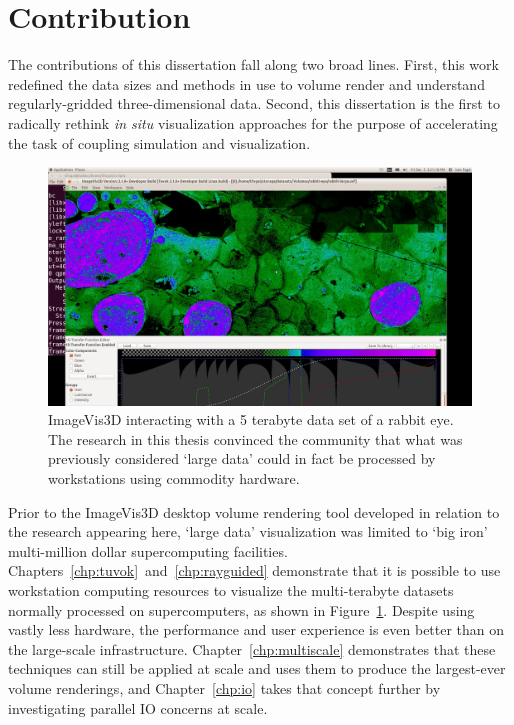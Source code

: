 
\section{Contribution}

The contributions of this dissertation fall along two broad lines.
First, this work redefined the data sizes and methods in use to volume
render and understand regularly-gridded three-dimensional data.
Second, this dissertation is the first to radically rethink \textit{in
situ} visualization approaches for the purpose of accelerating the task
of coupling simulation and visualization.

\begin{figure}
	\includegraphics[width=\linewidth]{images/rabbit5tb}

  \caption{ImageVis3D interacting with a 5 terabyte data set of a
  rabbit eye.  The research in this thesis convinced the community
  that what was previously considered `large data' could in fact be
  processed by workstations using commodity hardware.}

	\label{fig:rabbit5tb}
\end{figure}

Prior to the ImageVis3D desktop volume rendering tool developed in
relation to the research appearing here, `large data' visualization was
limited to `big iron' multi-million dollar supercomputing facilities.
Chapters~\ref{chp:tuvok}~and~\ref{chp:rayguided} demonstrate that it
is possible to use workstation computing resources to visualize the
multi-terabyte datasets normally processed on supercomputers, as shown in
Figure~\ref{fig:rabbit5tb}.  Despite
using vastly less hardware, the performance and user experience is even
better than on the large-scale infrastructure.
Chapter~\ref{chp:multiscale} demonstrates that these techniques can
still be applied at scale and uses them to produce the largest-ever
volume renderings, and Chapter~\ref{chp:io} takes that concept further
by investigating parallel IO concerns at scale.

